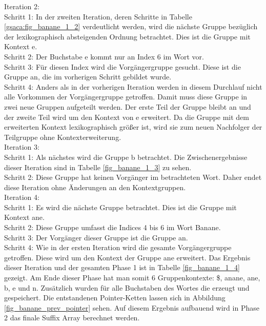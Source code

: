 Iteration 2:\\
Schritt 1: In der zweiten Iteration, deren Schritte in Tabelle \ref{gsaca:fig_banane_1_2} verdeutlicht werden, wird die nächste Gruppe bezüglich der lexikographisch absteigenden Ordnung betrachtet. 
Dies ist die Gruppe mit Kontext e.\\
Schritt 2: Der Buchstabe e kommt nur an Index 6 im Wort vor.\\
Schritt 3: Für diesen Index wird die Vorgängergruppe gesucht. 
Diese ist die Gruppe an, die im vorherigen Schritt gebildet wurde.\\
Schritt 4: Anders als in der vorherigen Iteration werden in diesem Durchlauf nicht alle Vorkommen der Vorgängergruppe getroffen. 
Damit muss diese Gruppe in zwei neue Gruppen aufgeteilt werden. 
Der erste Teil der Gruppe bleibt an und der zweite Teil wird um den Kontext von e erweitert. 
Da die Gruppe mit dem erweiterten Kontext lexikographisch größer ist, wird sie zum neuen Nachfolger der Teilgruppe ohne Kontexterweiterung.\\

Iteration 3:\\
Schritt 1: Als nächstes wird die Gruppe b betrachtet. 
Die Zwischenergebnisse dieser Iteration sind in Tabelle \ref{fig_banane_1_3} zu sehen.\\
Schritt 2: Diese Gruppe hat keinen Vorgänger im betrachteten Wort. 
Daher endet diese Iteration ohne Änderungen an den Kontextgruppen.\\

Iteration 4: \\
Schritt 1: Es wird die nächste Gruppe betrachtet. Dies ist die Gruppe mit Kontext ane.\\
Schritt 2: Diese Gruppe umfasst die Indices 4 bis 6 im Wort Banane.\\
Schritt 3: Der Vorgänger dieser Gruppe ist die Gruppe an.\\
Schritt 4: Wie in der ersten Iteration wird die gesamte Vorgängergruppe getroffen. 
Diese wird um den Kontext der Gruppe ane erweitert. 
Das Ergebnis dieser Iteration und der gesamten Phase 1 ist in Tabelle \ref{fig_banane_1_4} gezeigt. 
Am Ende dieser Phase hat man somit 6 Gruppenkontexte: \$, anane, ane, b, e und n. 
Zusätzlich wurden für alle Buchstaben des Wortes die \prevpointer erzeugt und gespeichert. 
Die entstandenen Pointer-Ketten lassen sich in Abbildung \ref{fig_banane_prev_pointer} sehen. 
Auf diesem Ergebnis aufbauend wird in Phase 2 das finale Suffix Array berechnet werden.\\

